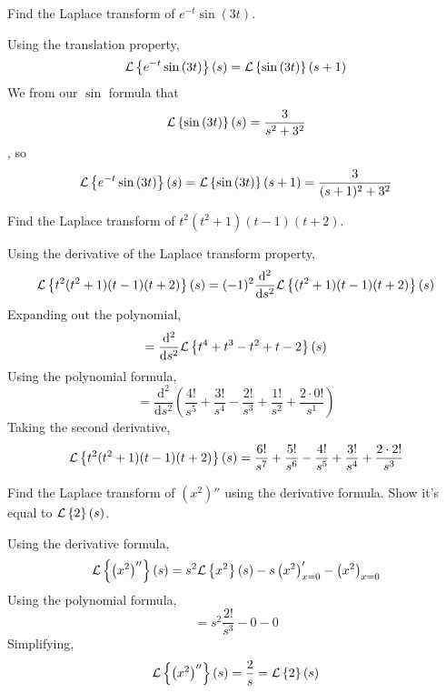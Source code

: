\begin{example}
	Find the Laplace transform of $e^{-t}\sin{(3t)}$.
\end{example}
\noindent
Using the translation property,
\begin{equation*}
	\mathcal{L}\left\{ e^{-t}\sin{(3t)} \right\}\left(s\right) = \mathcal{L}\left\{\sin{(3t)}\right\}(s+1)
\end{equation*}
We from our $\sin$ formula that
\begin{equation*}
	\mathcal{L}\left\{ \sin{(3t)} \right\}\left(s\right) = \frac{3}{s^2 + 3^2}
\end{equation*}
, so
\begin{equation*}
	\mathcal{L}\left\{ e^{-t}\sin{(3t)} \right\}\left(s\right) = \mathcal{L}\left\{\sin{(3t)}\right\}(s+1) = \frac{3}{(s+1)^2 + 3^2}
\end{equation*}

\begin{example}
	Find the Laplace transform of $t^2(t^2 + 1)(t - 1)(t + 2)$.
\end{example}
\noindent
Using the derivative of the Laplace transform property,
\begin{equation*}
	\mathcal{L}\left\{ t^2(t^2 + 1)(t - 1)(t + 2) \right\}\left(s\right) = (-1)^2\frac{\mathrm{d}^2}{\mathrm{d}s^2}\mathcal{L}\left\{ (t^2 + 1)(t - 1)(t + 2) \right\}\left(s\right)
\end{equation*}
Expanding out the polynomial,
\begin{equation*}
	 = \frac{\mathrm{d}^2}{\mathrm{d}s^2}\mathcal{L}\left\{ t^4 + t^3 - t^2 + t - 2 \right\}\left(s\right)
\end{equation*}
Using the polynomial formula,
\begin{equation*}
	 = \frac{\mathrm{d}^2}{\mathrm{d}s^2}\left(\frac{4!}{s^5} + \frac{3!}{s^4} - \frac{2!}{s^3} + \frac{1!}{s^2} + \frac{2\cdot 0!}{s^1}\right)
\end{equation*}
Taking the second derivative,
\begin{equation*}
	 \mathcal{L}\left\{ t^2(t^2 + 1)(t - 1)(t + 2) \right\}\left(s\right) = \frac{6!}{s^7} + \frac{5!}{s^6} - \frac{4!}{s^5} + \frac{3!}{s^4} + \frac{2\cdot 2!}{s^3}
\end{equation*}

\begin{example}
	Find the Laplace transform of $\left(x^2\right)''$ using the derivative formula. Show it's equal to $\mathcal{L}\left\{ 2 \right\}\left(s\right)$.
\end{example}
\noindent
Using the derivative formula,
\begin{equation*}
	\mathcal{L}\left\{ \left(x^2\right)'' \right\}\left(s\right) = s^2\mathcal{L}\left\{ x^2 \right\}\left(s\right) - s\left(x^2\right)'_{x=0} - \left(x^2\right)_{x=0}
\end{equation*}
Using the polynomial formula,
\begin{equation*}
 	= s^2\frac{2!}{s^3} - 0 - 0
\end{equation*}
Simplifying,
\begin{equation*}
	\mathcal{L}\left\{ \left(x^2\right)'' \right\}\left(s\right) = \frac{2}{s} = \mathcal{L}\left\{ 2 \right\}\left(s\right)
\end{equation*}

